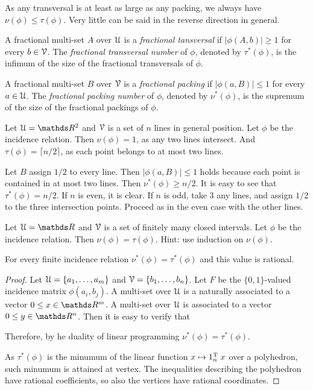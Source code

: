 \documentclass[sputnik.tex]{subfiles}
\begin{document}
As any transversal is at least as large as any packing, we always have $\nu(\phi)\le\tau(\phi)$.
Very little can be said in the reverse direction in general.

A fractional multi-set $A$ over $\EuScript U$ is a \emph{fractional tansversal\/} if $|\phi(A, b)|\ge1$ for every $b\in\EuScript V$.
The \emph{fractional transversal number\/} of $\phi$, denoted by $\tau^*(\phi)$, is the  infimum of the size of the fractional transversals of $\phi$.

A fractional multi-set $B$ over $\EuScript V$ is a \emph{fractional packing\/} if $|\phi(a,B)|\le1$ for every $a\in\EuScript U$.
The \emph{fractional packing number\/} of $\phi$, denoted by $\nu^*(\phi)$, is the supremum of the size of the fractional packings of $\phi$.

\begin{example}
Let $\U=\RR^2$ and $\EuScript V$ is a set of $n$ lines in general position.
Let $\phi$ be the incidence relation.
Then $\nu(\phi)=1$, as any two lines intersect.
And $\tau(\phi)=\lceil n/2\rceil$, as each point belongs to at most two lines.

Let $B$ assign $1/2$ to every line. Then $|\phi(a,B)|\le1$ holds because each point is contained in at most two lines.
Then $\nu^*(\phi)\ge n/2$.
It is easy to see that $\tau^*(\phi)= n/2$.
If $n$ is even, it is clear.
If $n$ is odd, take $3$ any lines, and assign $1/2$ to the three intersection points.
Proceed as in the even case with the other lines.\QED
\end{example}

\begin{exercise}
Let $\U=\RR$ and $\EuScript V$ is a set of finitely many closed intervals.
Let $\phi$ be the incidence relation.
Then $\nu(\phi)=\tau(\phi)$.
Hint: use induction on $\nu(\phi)$.
\end{exercise}

\begin{theorem}\label{thm_fractional_nu=tau}
For every finite incidence relation $\nu^*(\phi)=\tau^*(\phi)$ and this value is rational.
\end{theorem}
\begin{proof}
Let $\EuScript U=\{a_1,\dots,a_m\}$ and $\EuScript V=\{b_1,\dots,b_n\}$.
Let $F$ be the $\{0,1\}$-valued incidence matrix $\phi(a_i,b_j)$.
A multi-set over $\EuScript U$ is a naturally associated to a vector $0\le x\in\RR^m$.
A multi-set over $\EuScript U$ is associated to a vector $0\le y\in\RR^n$.
Then it is easy to verify that



Therefore, by he duality of linear programming  $\nu^*(\phi)=\tau^*(\phi)$.

As $\tau^*(\phi)$ is the minumum of the linear function $x\mapsto 1_n^{\rm T}\;x$ over a polyhedron, such minumum is attained at  vertex.
The inequalities describing the polyhedron have rational coefficients, so also the vertices have rational coordinates.
\end{proof}
\end{document}
